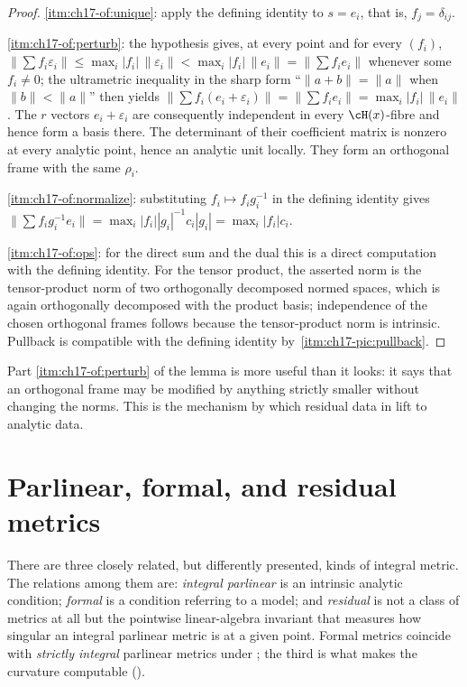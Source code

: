 \begin{proof}
\cref{itm:ch17-of:unique}: apply the defining identity to
$s=e_i$, that is, $f_j=\delta_{ij}$.

\cref{itm:ch17-of:perturb}: the hypothesis gives, at every point and for
every $(f_i)$,
$\bigl\|\sum f_i\varepsilon_i\bigr\|\le\max_i|f_i|\,\|\varepsilon_i\|
 <\max_i|f_i|\,\|e_i\|=\bigl\|\sum f_ie_i\bigr\|$
whenever some $f_i\ne0$; the ultrametric inequality in the sharp form
``$\|a+b\|=\|a\|$ when $\|b\|<\|a\|$'' then yields
$\bigl\|\sum f_i(e_i+\varepsilon_i)\bigr\|=\bigl\|\sum f_ie_i\bigr\|
 =\max_i|f_i|\,\|e_i\|$.
The $r$ vectors $e_i+\varepsilon_i$ are consequently independent in
every $\cH(x)$-fibre and hence form a basis there.  The determinant
of their coefficient matrix is nonzero at every analytic point, hence
an analytic unit locally.  They form an orthogonal frame with the
same $\rho_i$.

\cref{itm:ch17-of:normalize}: substituting $f_i\mapsto f_ig_i^{-1}$ in the
defining identity gives
$\bigl\|\sum f_ig_i^{-1}e_i\bigr\|=\max_i|f_i||g_i|^{-1}c_i|g_i|
 =\max_i|f_i|c_i$.

\cref{itm:ch17-of:ops}: for the direct sum and the dual this is a direct
computation with the defining identity.  For the tensor product, the
asserted norm is the tensor-product norm of two orthogonally decomposed
normed spaces, which is again orthogonally decomposed with the product
basis; independence of the chosen orthogonal frames follows because the
tensor-product norm is intrinsic.  Pullback is compatible with the defining
identity by \,\cref{itm:ch17-pic:pullback}.
\end{proof}

Part \cref{itm:ch17-of:perturb} of the lemma is more useful than it looks:
it says that an orthogonal frame may be modified by anything strictly
smaller without changing the norms.  This is the mechanism by which
residual data in  lift to analytic data.

\section{Parlinear, formal, and residual metrics}
\label{sec:ch17-parlinear}

There are three closely related, but differently presented, kinds of
integral metric.  The relations among them are: \emph{integral parlinear}
is an intrinsic analytic condition; \emph{formal} is a condition referring
to a model; and \emph{residual} is not a class of metrics at all but the
pointwise linear-algebra invariant that measures how singular an integral
parlinear metric is at a given point.  Formal metrics coincide with
\emph{strictly integral} parlinear metrics under
; the third is what makes the
curvature computable ().

